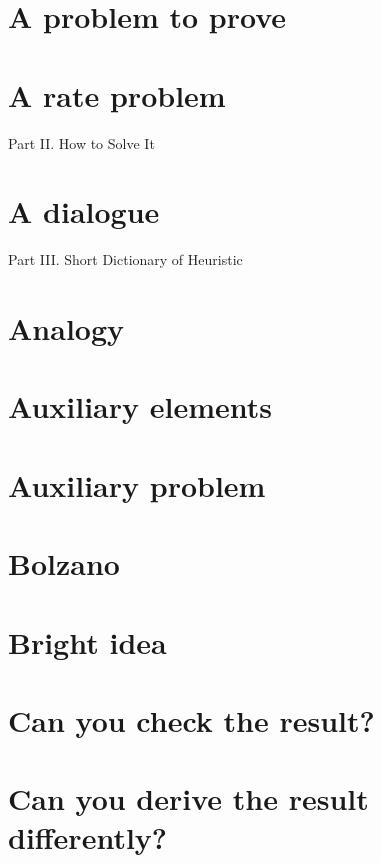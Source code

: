 \documentclass[oneside]{book}
\numberwithin{equation}{section}
\begin{document}
\section{A problem to prove}

\section{A rate problem}

\begin{center}
	\huge Part II. How to Solve It
\end{center}

\section*{A dialogue}

\begin{center}
	\huge Part III. Short Dictionary of Heuristic
\end{center}

\section*{Analogy}

\section*{Auxiliary elements}

\section*{Auxiliary problem}

\section*{Bolzano}

\section*{Bright idea}

\section*{Can you check the result?}

\section*{Can you derive the result differently?}
\end{document}
